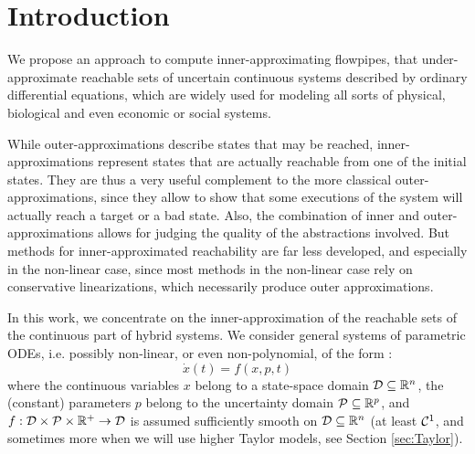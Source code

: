 \documentclass{sig-alternate-05-2015}
\def\R{{\mathbb R}}
\begin{document}


%
%

%
%





\section{Introduction}

We propose an approach to compute inner-approxi\-mating flowpipes, that under-approximate reachable sets 
of uncertain continuous systems described by ordinary differential equations, which 
are widely used for modeling all sorts of physical, biological and even economic or
social systems.  

While outer-approximations describe states that may be rea\-ched, inner-approximations represent
states that are actually reachable from one of the initial states. They are
thus a very useful complement to the more classical outer-approxima\-tions, since they allow to show
that some executions of the system will actually reach a target or a bad state. Also, the combination of
inner and outer-approximations allows for judging the quality of the abstractions involved. 
But methods for inner-approximated reachability are far less developed, and especially in the non-linear case, 
since most methods in the non-linear case rely on conservative linearizations, which necessarily produce outer approximations.

In this work, we concentrate on the inner-approximation of the reachable sets of
the continuous part of hybrid systems. %
We consider general systems of parametric ODEs, i.e. possibly non-linear, or
even non-polyno\-mial, of the form : 
\begin{equation}
\dot{x}(t) = f(x,p,t)
\label{eq:flow}
\end{equation}
\noindent where the continuous variables $x$ belong to a state-space domain 
${\cal D} \subseteq \R^n$, the (constant) parameters $p$ belong to the uncertainty domain
${\cal P} \subseteq \R^p$, and 
$f: {\cal D} \times {\cal P} \times \R^+ \rightarrow {\cal D}$ is assumed sufficiently smooth 
on ${\cal D} \subseteq \R^n$ (at least ${\cal C}^1$, and sometimes more when we will use higher
Taylor models, see Section \ref{sec:Taylor}).
\end{document}
